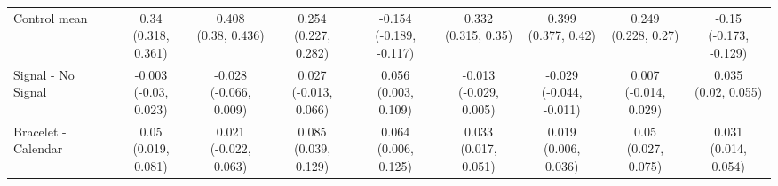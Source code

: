 \documentclass[
]{article}
\begin{document}
\begin{table}
{\begin{tabular}[t]{lcccccccc}
\midrule
\addlinespace \addlinespace \addlinespace
Control mean & \makecell[c]{0.34\\(0.318, 0.361)} & \makecell[c]{0.408\\(0.38, 0.436)} & \makecell[c]{0.254\\(0.227, 0.282)} & \makecell[c]{-0.154\\(-0.189, -0.117)} & \makecell[c]{0.332\\(0.315, 0.35)} & \makecell[c]{0.399\\(0.377, 0.42)} & \makecell[c]{0.249\\(0.228, 0.27)} & \makecell[c]{-0.15\\(-0.173, -0.129)}\\
\addlinespace \addlinespace \addlinespace
Signal - No Signal & \makecell[c]{-0.003\\(-0.03, 0.023)} & \makecell[c]{-0.028\\(-0.066, 0.009)} & \makecell[c]{0.027\\(-0.013, 0.066)} & \makecell[c]{0.056\\(0.003, 0.109)} & \makecell[c]{-0.013\\(-0.029, 0.005)} & \makecell[c]{-0.029\\(-0.044, -0.011)} & \makecell[c]{0.007\\(-0.014, 0.029)} & \makecell[c]{0.035\\(0.02, 0.055)}\\
\addlinespace \addlinespace \addlinespace
Bracelet - Calendar & \makecell[c]{0.05\\(0.019, 0.081)} & \makecell[c]{0.021\\(-0.022, 0.063)} & \makecell[c]{0.085\\(0.039, 0.129)} & \makecell[c]{0.064\\(0.006, 0.125)} & \makecell[c]{0.033\\(0.017, 0.051)} & \makecell[c]{0.019\\(0.006, 0.036)} & \makecell[c]{0.05\\(0.027, 0.075)} & \makecell[c]{0.031\\(0.014, 0.054)}\\
\bottomrule
\end{tabular}}
\end{table}
\end{document}
